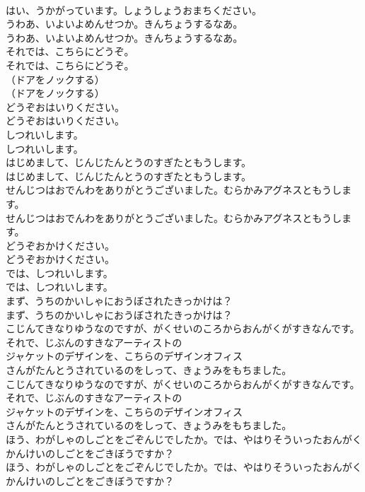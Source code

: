 \documentclass[8pt]{extreport}
\begin{document}
\begin{CJK}{UTF8}{min}
\\	はい、うかがっています。しょうしょうおまちください。
\\	うわあ、いよいよめんせつか。きんちょうするなあ。
\\	うわあ、いよいよめんせつか。きんちょうするなあ。
\\	それでは、こちらにどうぞ。
\\	それでは、こちらにどうぞ。
\\	（ドアをノックする）
\\	（ドアをノックする）
\\	どうぞおはいりください。
\\	どうぞおはいりください。
\\	しつれいします。
\\	しつれいします。
\\	はじめまして、じんじたんとうのすぎたともうします。
\\	はじめまして、じんじたんとうのすぎたともうします。
\\	せんじつはおでんわをありがとうございました。むらかみアグネスともうします。
\\	せんじつはおでんわをありがとうございました。むらかみアグネスともうします。
\\	どうぞおかけください。
\\	どうぞおかけください。
\\	では、しつれいします。
\\	では、しつれいします。
\\	まず、うちのかいしゃにおうぼされたきっかけは？
\\	まず、うちのかいしゃにおうぼされたきっかけは？
\\	こじんてきなりゆうなのですが、がくせいのころからおんがくがすきなんです。それで、じぶんのすきなアーティストの
\\	ジャケットのデザインを、こちらのデザインオフィス
\\	さんがたんとうされているのをしって、きょうみをもちました。
\\	こじんてきなりゆうなのですが、がくせいのころからおんがくがすきなんです。それで、じぶんのすきなアーティストの
\\	ジャケットのデザインを、こちらのデザインオフィス
\\	さんがたんとうされているのをしって、きょうみをもちました。
\\	ほう、わがしゃのしごとをごぞんじでしたか。では、やはりそういったおんがくかんけいのしごとをごきぼうですか？
\\	ほう、わがしゃのしごとをごぞんじでしたか。では、やはりそういったおんがくかんけいのしごとをごきぼうですか？

\end{CJK}
\end{document}
